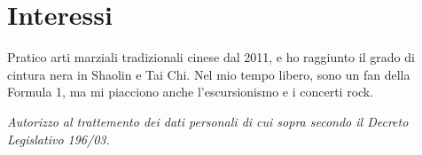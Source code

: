 \documentclass[a4paper,italian]{twentysecondcv} %
\begin{document}
\section{Interessi}

Pratico arti marziali tradizionali cinese dal 2011, e ho raggiunto il grado di cintura nera in Shaolin e Tai Chi. Nel mio tempo libero, sono un fan della Formula 1, ma mi piacciono anche l'escursionismo e i concerti rock.






\vspace*{\fill}
\begin{center}
{\footnotesize \itshape Autorizzo al trattemento dei dati personali di cui sopra secondo il Decreto Legislativo 196/03.}
\end{center}
\end{document}

